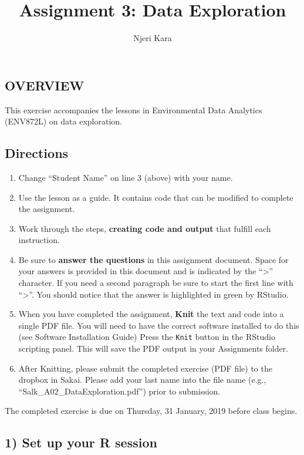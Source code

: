 \documentclass[]{article}
\title{Assignment 3: Data Exploration}
\author{Njeri Kara}
\date{}
\providecommand{\tightlist}{%
  \setlength{\itemsep}{0pt}\setlength{\parskip}{0pt}}
\begin{document}
\maketitle

\subsection{OVERVIEW}\label{overview}

This exercise accompanies the lessons in Environmental Data Analytics
(ENV872L) on data exploration.

\subsection{Directions}\label{directions}

\begin{enumerate}
\def\labelenumi{\arabic{enumi}.}
\tightlist
\item
  Change ``Student Name'' on line 3 (above) with your name.
\item
  Use the lesson as a guide. It contains code that can be modified to
  complete the assignment.
\item
  Work through the steps, \textbf{creating code and output} that fulfill
  each instruction.
\item
  Be sure to \textbf{answer the questions} in this assignment document.
  Space for your answers is provided in this document and is indicated
  by the ``\textgreater{}'' character. If you need a second paragraph be
  sure to start the first line with ``\textgreater{}''. You should
  notice that the answer is highlighted in green by RStudio.
\item
  When you have completed the assignment, \textbf{Knit} the text and
  code into a single PDF file. You will need to have the correct
  software installed to do this (see Software Installation Guide) Press
  the \texttt{Knit} button in the RStudio scripting panel. This will
  save the PDF output in your Assignments folder.
\item
  After Knitting, please submit the completed exercise (PDF file) to the
  dropbox in Sakai. Please add your last name into the file name (e.g.,
  ``Salk\_A02\_DataExploration.pdf'') prior to submission.
\end{enumerate}

The completed exercise is due on Thursday, 31 January, 2019 before class
begins.

\subsection{1) Set up your R session}\label{set-up-your-r-session}
\end{document}
